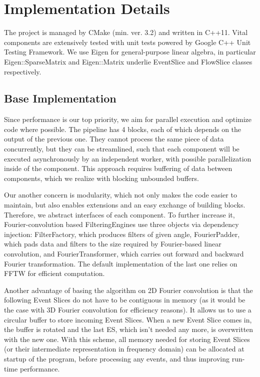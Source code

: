 \section{Implementation Details}
The project is managed by CMake (min. ver. 3.2) and written in C++11. 
Vital components are extensively tested with unit tests powered by Google C++ Unit Testing Framework. 
We use Eigen for general-purpose linear algebra, in particular Eigen::SparseMatrix and Eigen::Matrix underlie EventSlice and FlowSlice classes respectively.

\subsection{Base Implementation}

Since performance is our top priority, we aim for parallel execution and optimize code where possible. 
The pipeline has 4 blocks, each of which depends on the output of the previous one. 
They cannot process the same piece of data concurrently, but they can be streamlined, such that each component will be executed asynchronously by an independent worker, with possible parallelization inside of the component.
This approach requires buffering of data between components, which we realize with blocking unbounded buffers. 

Our another concern is modularity, which not only makes the code easier to maintain, but also enables extensions and an easy exchange of building blocks. 
Therefore, we abstract interfaces of each component.
To further increase it, Fourier-convolution based FilteringEngines use three objects via dependency injection: FilterFactory, which produces filters of given angle, FourierPadder, which pads data and filters to the size required by Fourier-based linear convolution, and FourierTransformer, which carries out forward and backward Fourier transformation. The default implementation of the last one relies on FFTW for efficient computation.

Another advantage of basing the algorithm on 2D Fourier convolution is that the following Event Slices do not have to be contiguous in memory (as it would be the case with 3D Fourier convolution for efficiency reasons).
It allows us to use a circular buffer to store incoming Event Slices.
When a new Event Slice comes in, the buffer is rotated and the last ES, which isn't needed any more, is overwritten with the new one.
With this scheme, all memory needed for storing Event Slices (or their intermediate representation in frequency domain) can be allocated at startup of the program, before processing any events, and thus improving run-time performance.

